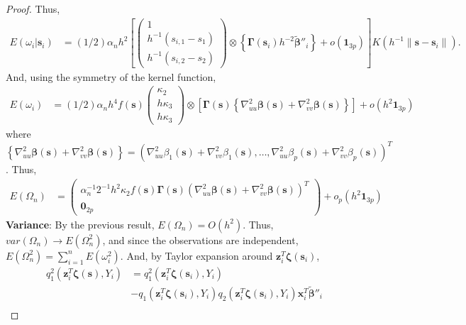 \documentclass[authoryear,review, 12pt]{elsarticle}
\begin{document}
\begin{proof}
Thus,
\begin{align*}
E\left(\omega_{i}|\bm{s}_{i}\right) &= \left(1/2\right)\alpha_{n}h^{2}\left[\left(\begin{array}{c}
1\\
h^{-1}(s_{i,1}-s_{1})\\
h^{-1}(s_{i,2}-s_{2})
\end{array}\right)\otimes\left\{ \bm{\Gamma}(\bm{s}_{i})h^{-2}\tilde{\bm{\beta}}''_{i}\right\} +o\left(\bm{1}_{3p}\right)\right]K\left(h^{-1}\|\bm{s}-\bm{s}_{i}\|\right).
\end{align*}
And, using the symmetry of the kernel function,
\begin{align*}
E\left(\omega_{i}\right) &= (1/2)\alpha_{n}h^{4}f(\bm{s})\left(\begin{array}{c}
\kappa_{2}\\
h\kappa_{3}\\
h\kappa_{3}
\end{array}\right)\otimes\left[\bm{\Gamma}(\bm{s})\left\{ \nabla_{uu}^{2}\bm{\beta}(\bm{s})+\nabla_{vv}^{2}\bm{\beta}(\bm{s})\right\} \right]+o\left(h^{2}\bm{1}_{3p}\right)
\end{align*}
where $\left\{ \nabla_{uu}^{2}\bm{\beta}(\bm{s})+\nabla_{vv}^{2}\bm{\beta}(\bm{s})\right\} =\left(\nabla_{uu}^{2}\beta_{1}(\bm{s})+\nabla_{vv}^{2}\beta_{1}(\bm{s}),\dots,\nabla_{uu}^{2}\beta_{p}(\bm{s})+\nabla_{vv}^{2}\beta_{p}(\bm{s})\right)^{T}$.
Thus,
\begin{align*}
E\left(\Omega_{n}\right) &= \left(\begin{array}{c}
\alpha_{n}^{-1}2^{-1}h^{2}\kappa_{2}f(\bm{s})\bm{\Gamma}(\bm{s})\left(\nabla_{uu}^{2}\bm{\beta}(\bm{s})+\nabla_{vv}^{2}\bm{\beta}(\bm{s})\right)^{T}\\
\bm{0}_{2p}
\end{array}\right)+o_{p}\left(h^{2}\bm{1}_{3p}\right)
\end{align*}
\textbf{Variance}: By the previous result, $E\left(\Omega_{n}\right)=O\left(h^{2}\right)$.
Thus, $var\left(\Omega_{n}\right)\to E\left(\Omega_{n}^{2}\right)$,
and since the observations are independent, $E\left(\Omega_{n}^{2}\right)=\sum_{i=1}^{n}E\left(\omega_{i}^{2}\right)$.
And, by Taylor expansion around $\bm{z}_{i}^{T}\bm{\zeta}(\bm{s}_{i})$, 
\begin{align*}
q_{1}^{2}\left(\bm{z}_{i}^{T}\bm{\zeta}(\bm{s}),Y_{i}\right) &=  q_{1}^{2}\left(\bm{z}_{i}^{T}\bm{\zeta}(\bm{s}_{i}),Y_{i}\right)\\
 & -q_{1}\left(\bm{z}_{i}^{T}\bm{\zeta}(\bm{s}_{i}),Y_{i}\right)q_{2}\left(\bm{z}_{i}^{T}\bm{\zeta}(\bm{s}_{i}),Y_{i}\right)\bm{x}_{i}^{T}\tilde{\bm{\beta}}''_{i}\\

\end{align*}
\end{proof}
\end{document}
